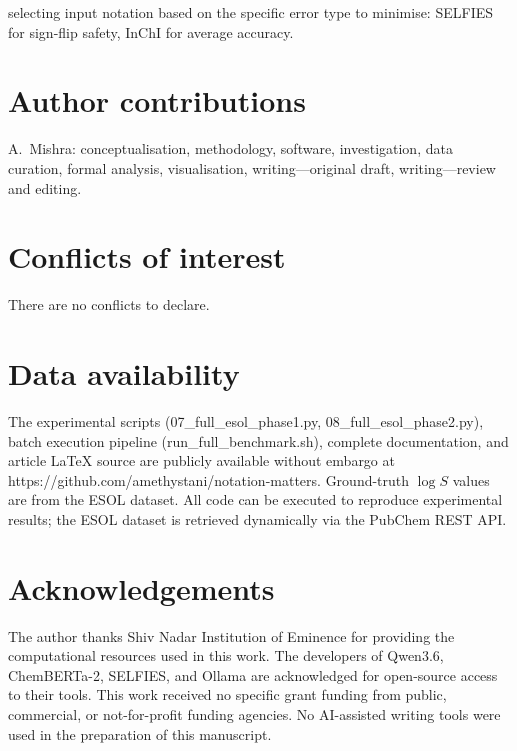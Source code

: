 \documentclass[twoside,twocolumn,9pt]{article}
\newcommand{\logS}{\ensuremath{\log S}}
\begin{document}
selecting input notation based on the specific error type to minimise: SELFIES for sign-flip safety, InChI for average accuracy.

\section*{Author contributions}

A.~Mishra: conceptualisation, methodology, software, investigation, data curation, formal analysis, visualisation, writing---original draft, writing---review and editing.

\section*{Conflicts of interest}

There are no conflicts to declare.

\section*{Data availability}

The experimental scripts (07\_full\_esol\_phase1.py, 08\_full\_esol\_phase2.py), batch execution pipeline (run\_full\_benchmark.sh), complete documentation, and article LaTeX source are publicly available without embargo at https://github.com/amethystani/notation-matters. Ground-truth $\logS$ values are from the ESOL dataset.\cite{delaney2004} All code can be executed to reproduce experimental results; the ESOL dataset is retrieved dynamically via the PubChem REST API.

\section*{Acknowledgements}

The author thanks Shiv Nadar Institution of Eminence for providing the computational resources used in this work. The developers of Qwen3.6, ChemBERTa-2, SELFIES, and Ollama are acknowledged for open-source access to their tools. This work received no specific grant funding from public, commercial, or not-for-profit funding agencies. No AI-assisted writing tools were used in the preparation of this manuscript.


\balance



\end{document}
